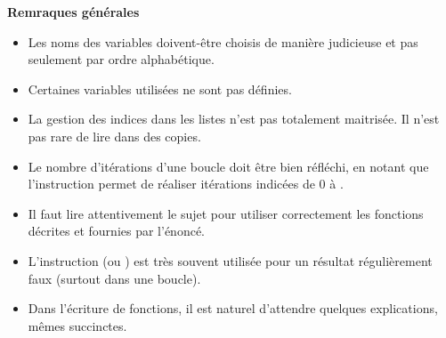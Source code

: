 \documentclass[10pt,fleqn]{article} %
\begin{document}

\pagestyle{fancy}
\thispagestyle{plain}


\def\columnseprulecolor{\color{ocre}}
\setlength{\columnseprule}{0.4pt} 



\vspace{6cm}


\textbf{Remraques générales}
\begin{itemize}
\item Les noms des variables doivent-être choisis de manière judicieuse et pas seulement par ordre alphabétique.
\item Certaines variables utilisées ne sont pas définies.
\item La gestion des indices dans les listes n’est pas totalement maitrisée. Il n’est pas rare de lire
 dans des copies.
\item Le nombre d’itérations d’une boucle doit être bien réfléchi, en notant que l’instruction 
permet de réaliser  itérations indicées de 0 à .
\item Il faut lire attentivement le sujet pour utiliser correctement les fonctions décrites et fournies par
l’énoncé.
\item L’instruction  (ou ) est très souvent utilisée pour un résultat régulièrement faux (surtout dans une
boucle).
\item Dans l’écriture de fonctions, il est naturel d’attendre quelques explications, mêmes succinctes.
\end{itemize}




%
\end{document}
